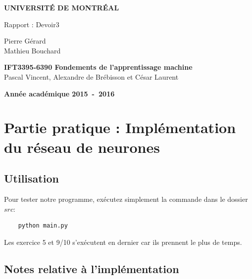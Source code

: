 \documentclass[a4paper,11pt]{article}
\begin{document}
\begin{titlepage}
\begin{center}
\textbf{\textsc{UNIVERSIT\'E DE MONTR\'EAL}}\\
\vfill{}\vfill{}
\begin{center}{\Huge Rapport : Devoir3 }\end{center}{\Huge \par}
\begin{center}{\large Pierre Gérard \\ Mathieu Bouchard}\end{center}{\Huge \par}
\vfill{}\vfill{} \vfill{}
\begin{center}{\large \textbf{IFT3395-6390 Fondements de l'apprentissage machine}}\hfill{\\Pascal Vincent, Alexandre de Brébisson et César Laurent}\end{center}{\large\par}
\vfill{}\vfill{}\enlargethispage{3cm}
\textbf{Année académique 2015~-~2016}
\end{center}
\end{titlepage}





\section{Partie pratique : Implémentation du réseau de neurones}

\subsection{Utilisation}

Pour tester notre programme, exécutez simplement la commande dans le dossier $src$:

\begin{verbatim}
	python main.py
\end{verbatim}

Les exercice 5 et 9/10 s'exécutent en dernier car ils prennent le plus de temps.
\subsection{Notes relative à l'implémentation}
\end{document}
